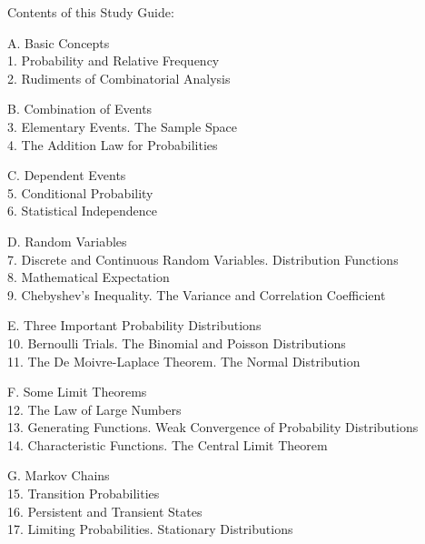 \documentclass{pset}
\theoremstyle{definition}\newtheorem*{defn}{Definition}
\theoremstyle{definition}\newtheorem*{eg}{Example}
\theoremstyle{theorem}\newtheorem{prop}{Proposition}
\theoremstyle{definition}\newtheorem{ex}{Exercise}
\theoremstyle{definition}\newtheorem*{question}{Question}
\theoremstyle{definition}\newtheorem*{answer}{Answer}
\theoremstyle{definition}\newtheorem*{oproblem}{Open Problem}
\theoremstyle{theorem}\newtheorem{thm}{Theorem}
\theoremstyle{theorem}\newtheorem{lemma}{Lemma}
\theoremstyle{definition}\newtheorem*{remark}{Remark}
\theoremstyle{definition}\newtheorem*{observation}{Observation}
\theoremstyle{definition}\newtheorem*{aside}{Aside}
\theoremstyle{definition}\newtheorem*{hint}{Hint}
\theoremstyle{theorem}\newtheorem*{cor}{Corollary}
\begin{document}
\maketitle 

\newpage


Contents of this Study Guide:

A. {Basic Concepts}
\\ 1. Probability and Relative Frequency
\\ 2. Rudiments of Combinatorial Analysis

B. {Combination of Events}
\\ 3. Elementary Events.  The Sample Space
\\ 4. The Addition Law for Probabilities

C. {Dependent Events}
\\ 5. Conditional Probability
\\ 6. Statistical Independence

D. {Random Variables}
\\ 7. Discrete and Continuous Random Variables.  Distribution Functions
\\ 8. Mathematical Expectation
\\ 9. Chebyshev's Inequality.  The Variance and Correlation Coefficient

E. {Three Important Probability Distributions}
\\ 10. Bernoulli Trials.  The Binomial and Poisson Distributions
\\ 11.  The De Moivre-Laplace Theorem.  The Normal Distribution

F. {Some Limit Theorems}
\\ 12. The Law of Large Numbers
\\ 13.  Generating Functions.  Weak Convergence of Probability Distributions
\\ 14.  Characteristic Functions.  The Central Limit Theorem

G. {Markov Chains}
\\ 15. Transition Probabilities
\\ 16.  Persistent and Transient States
\\ 17.  Limiting Probabilities.  Stationary Distributions
\end{document}
